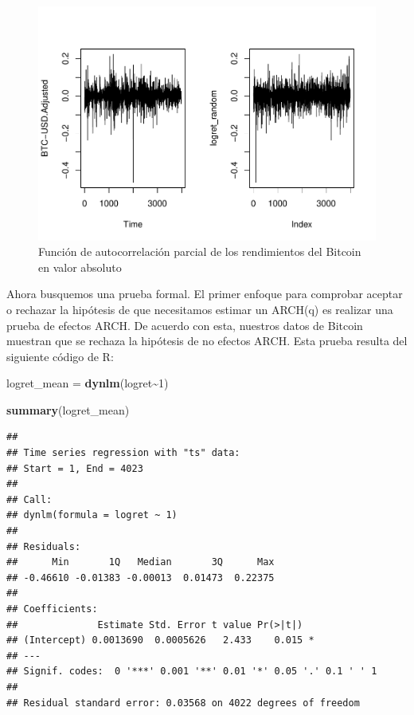 \documentclass[
]{book}
\newenvironment{Shaded}{\begin{snugshade}}{\end{snugshade}}
\newcommand{\DecValTok}[1]{\textcolor[rgb]{0.00,0.00,0.81}{#1}}
\newcommand{\FunctionTok}[1]{\textcolor[rgb]{0.13,0.29,0.53}{\textbf{#1}}}
\newcommand{\NormalTok}[1]{#1}
\newcommand{\OtherTok}[1]{\textcolor[rgb]{0.56,0.35,0.01}{#1}}
\newcommand{\SpecialCharTok}[1]{\textcolor[rgb]{0.81,0.36,0.00}{\textbf{#1}}}
\begin{document}
\begin{figure}

{\centering \includegraphics{Notas-Series-Tiempo_files/figure-latex/fig109-1} 

}

\caption{Función de autocorrelación parcial de los rendimientos del Bitcoin en valor absoluto}\label{fig:fig109}
\end{figure}

Ahora busquemos una prueba formal. El primer enfoque para comprobar aceptar o rechazar la hipótesis de que necesitamos estimar un ARCH(q) es realizar una prueba de efectos ARCH. De acuerdo con esta, nuestros datos de Bitcoin muestran que se rechaza la hipótesis de no efectos ARCH. Esta prueba resulta del siguiente código de R:

\begin{Shaded}
\begin{Highlighting}[]
\NormalTok{logret\_mean }\OtherTok{=} \FunctionTok{dynlm}\NormalTok{(logret}\SpecialCharTok{\textasciitilde{}}\DecValTok{1}\NormalTok{)}

\FunctionTok{summary}\NormalTok{(logret\_mean)}
\end{Highlighting}
\end{Shaded}

\begin{verbatim}
## 
## Time series regression with "ts" data:
## Start = 1, End = 4023
## 
## Call:
## dynlm(formula = logret ~ 1)
## 
## Residuals:
##      Min       1Q   Median       3Q      Max 
## -0.46610 -0.01383 -0.00013  0.01473  0.22375 
## 
## Coefficients:
##              Estimate Std. Error t value Pr(>|t|)  
## (Intercept) 0.0013690  0.0005626   2.433    0.015 *
## ---
## Signif. codes:  0 '***' 0.001 '**' 0.01 '*' 0.05 '.' 0.1 ' ' 1
## 
## Residual standard error: 0.03568 on 4022 degrees of freedom
\end{verbatim}
\end{document}
